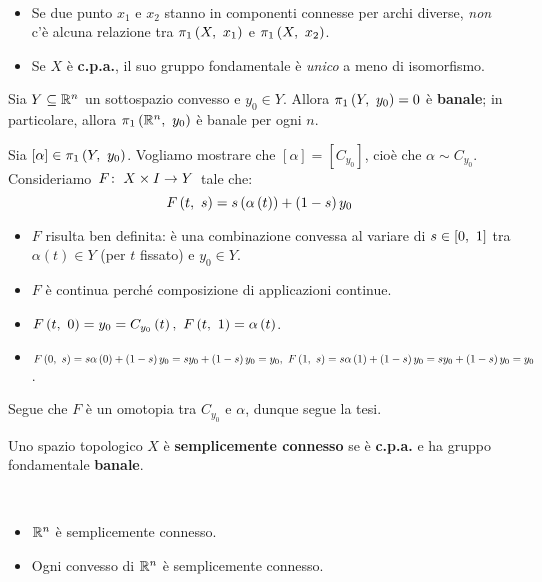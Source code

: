 \begin{observe}~{}
	\begin{itemize}
		\item Se due punto $x_1$ e $x_2$ stanno in componenti connesse per archi diverse, \textit{non} c'è alcuna relazione tra $\gruf{X}{x_1}$ e $\gruf{X}{x_2}$.
		\item Se $X$ è \textbf{c.p.a.}, il suo gruppo fondamentale è \textit{unico} a meno di isomorfismo.
	\end{itemize}
\end{observe}
\begin{example}
	Sia $Y\subseteq \mathbb{R}^n$ un sottospazio convesso e $y_0\in Y$.
	Allora $\gruf{Y}{y_0}=0$ è \textbf{banale}; in particolare, allora $\gruf{\realset^n}{y_0}$ è banale per ogni $n$.
\end{example}
\begin{demonstration}
	Sia $\left[\alpha\right]\in\gruf{Y}{y_0}$. Vogliamo mostrare che $\left[\alpha\right]=\left[C_{y_0}\right]$, cioè che $\alpha\sim C_{y_0}$.\\
	Consideriamo $\funz{F}{X\times I}{Y}$ tale che:
	\begin{equation*}
		F\left(t,\ s\right)=s\left(\alpha\left(t\right)\right)+\left(1-s\right)y_0
	\end{equation*}
\begin{itemize}
	\item $F$ risulta ben definita: è una combinazione convessa al variare di $s\in\left[0,\ 1\right]$ tra $\alpha\left(t\right)\in Y$ (per $t$ fissato) e $y_0\in Y$.
	\item $F$ è continua perché composizione di applicazioni continue.
	\item $\mvf{F}{t}{0}=y_0=C_{y_0}\left(t\right),\ \mvf{F}{t}{1}=\alpha\left(t\right)$.
	\item $\mvf{F}{0}{s}=s\alpha\left(0\right)+\left(1-s\right)y_0=sy_0+\left(1-s\right)y_0=y_0,\ \mvf{F}{1}{s}=s\alpha\left(1\right)+\left(1-s\right)y_0=sy_0+\left(1-s\right)y_0=y_0$.
\end{itemize}
Segue che $F$ è un omotopia tra $C_{y_0}$ e $\alpha$, dunque segue la tesi.
\end{demonstration}
\begin{define}
	Uno spazio topologico $X$ è \textbf{semplicemente connesso} se è \textbf{c.p.a.} e ha gruppo fondamentale \textbf{banale}.
\end{define}
\begin{examples}~{}
	\begin{itemize}
		\item $\mathbb{R}^n$ è semplicemente connesso.
		\item Ogni convesso di $\mathbb{R}^n$ è semplicemente connesso.
	\end{itemize}
\end{examples}